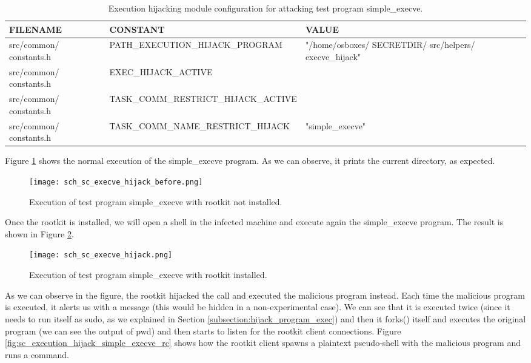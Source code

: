 \begin{table}[htbp]
\begin{tabular}{|>{\centering\arraybackslash}p{3cm}|>{\centering\arraybackslash}p{4.5cm}|>{\centering\arraybackslash}p{4cm}|}
\hline
\textbf{FILENAME} & \textbf{CONSTANT} & \textbf{VALUE}\\
\hline
\hline
src/common/ constants.h & PATH\_EXECUTION\_HIJACK\_PROGRAM & "/home/osboxes/ SECRETDIR/ src/helpers/ execve\_hijack"\\
\hline
src/common/ constants.h & EXEC\_HIJACK\_ACTIVE & 1\\
\hline
src/common/ constants.h & TASK\_COMM\_RESTRICT\_HIJACK\_ACTIVE & 1\\
\hline
src/common/ constants.h & TASK\_COMM\_NAME\_RESTRICT\_HIJACK & "simple\_execve"\\
\hline
\end{tabular}
\caption{Execution hijacking module configuration for attacking test program simple\_execve.}
\label{table:execution_hijack_config_simple_execve}
\end{table}

Figure \ref{fig:sc_execve_hijack_before_simple_execve} shows the normal execution of the simple\_execve program. As we can observe, it prints the current directory, as expected.

\begin{figure}[htbp]
	\centering
	\texttt{[image: sch\_sc\_execve\_hijack\_before.png]}
	\caption{Execution of test program simple\_execve with rootkit not installed.}
	\label{fig:sc_execve_hijack_before_simple_execve}
\end{figure}

Once the rootkit is installed, we will open a shell in the infected machine and execute again the simple\_execve program. The result is shown in Figure \ref{fig:sc_execve_hijack_simple_execve}.

\begin{figure}[htbp]
	\centering
	\texttt{[image: sch\_sc\_execve\_hijack.png]}
	\caption{Execution of test program simple\_execve with rootkit installed.}
	\label{fig:sc_execve_hijack_simple_execve}
\end{figure}

As we can observe in the figure, the rootkit hijacked the call and executed the malicious program instead. Each time the malicious program is executed, it alerts us with a message (this would be hidden in a non-experimental case). We can see that it is executed twice (since it needs to run itself as sudo, as we explained in Section \ref{subsection:hijack_program_exec}) and then it forks() itself and executes the original program (we can see the output of pwd) and then starts to listen for the rootkit client connections. Figure \ref{fig:sc_execution_hijack_simple_execve_rc} shows how the rootkit client spawns a plaintext pseudo-shell with the malicious program and runs a command.

